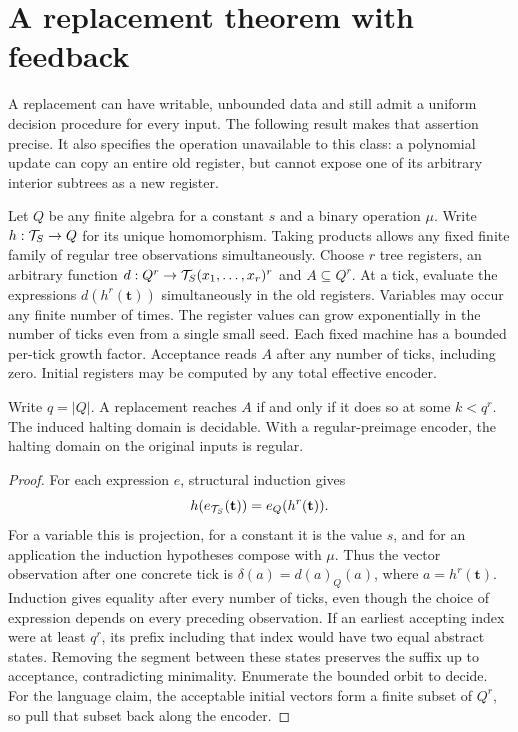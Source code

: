 \section{A replacement theorem with feedback}
\label{feedback}
A replacement can have writable, unbounded data and still admit a uniform decision procedure for every input. The following result makes that assertion precise. It also specifies the operation unavailable to this class: a polynomial update can copy an entire old register, but cannot expose one of its arbitrary interior subtrees as a new register.

Let \(Q\) be any finite algebra for a constant \(s\) and a binary operation \(\mu\). Write \(h:\mathcal T_S\to Q\) for its unique homomorphism. Taking products allows any fixed finite family of regular tree observations simultaneously. Choose \(r\) tree registers, an arbitrary function \(d:Q^r\to \mathcal T_S(x_1,\dots,x_r)^r\) and \(A\subseteq Q^r\). At a tick, evaluate the expressions \(d(h^r(\mathbf t))\) simultaneously in the old registers. Variables may occur any finite number of times. The register values can grow exponentially in the number of ticks even from a single small seed. Each fixed machine has a bounded per-tick growth factor. Acceptance reads \(A\) after any number of ticks, including zero. Initial registers may be computed by any total effective encoder.

\begin{theorem}\label{cutoff}
Write \(q=|Q|\). A replacement reaches \(A\) if and only if it does so at some \(k<q^r\). The induced halting domain is decidable. With a regular-preimage encoder, the halting domain on the original inputs is regular.
\end{theorem}
\begin{proof}
For each expression \(e\), structural induction gives
\[
 h(e_{\mathcal T_S}(\mathbf t))=e_Q(h^r(\mathbf t)).
\]
For a variable this is projection, for a constant it is the value \(s\), and for an application the induction hypotheses compose with \(\mu\). Thus the vector observation after one concrete tick is
\(\delta(a)=d(a)_Q(a)\), where \(a=h^r(\mathbf t)\). Induction gives equality after every number of ticks, even though the choice of expression depends on every preceding observation. If an earliest accepting index were at least \(q^r\), its prefix including that index would have two equal abstract states. Removing the segment between these states preserves the suffix up to acceptance, contradicting minimality. Enumerate the bounded orbit to decide. For the language claim, the acceptable initial vectors form a finite subset of \(Q^r\), so pull that subset back along the encoder.
\end{proof}

